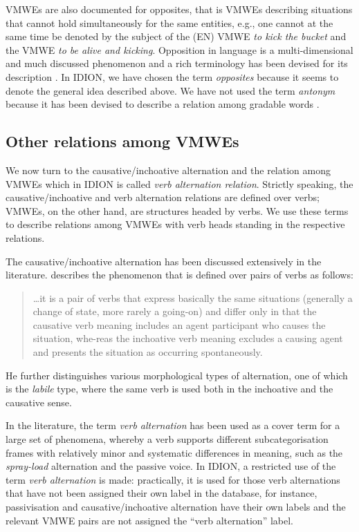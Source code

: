 \documentclass[output=paper,colorlinks,citecolor=brown]{langscibook}
\begin{document}
VMWEs are also documented for opposites, that is VMWEs describing situations that cannot hold simultaneously for the same entities, e.g., one cannot at the same time be denoted by the subject of the (EN) VMWE \textit{to kick the bucket} and the VMWE \textit{to be alive and kicking}. Opposition in language is a multi-dimensional and much discussed phenomenon and a rich terminology has been devised for its description \citep[270--287]{lyons}. In IDION, we have chosen the term \textit{opposites} because it seems to denote the general idea described above. We have not used the term \textit{antonym} because it has been devised to describe a relation among gradable words \citep{lyons}. 

\subsection{Other relations among VMWEs}
\label{sec:causative}

We now turn to the causative/inchoative alternation and the relation among VMWEs which in IDION is called \textit{verb alternation relation}. Strictly speaking, the causative/inchoative and verb alternation relations are defined over verbs;  VMWEs, on the other hand, are structures headed by verbs. We use these terms to describe relations among VMWEs with verb heads standing in the respective relations. 

The causative/inchoative alternation has been discussed extensively in the literature. \citet[90]{haspelmath} describes the phenomenon that is defined over pairs of verbs as follows: \begin{quote}
\ldots it is a pair of verbs that express basically the same situations (generally a change of state, more rarely a going-on) and differ only in that the causative verb meaning includes an agent participant who causes the situation, whe-reas the inchoative verb meaning excludes a causing agent and presents the situation as occurring spontaneously. \end{quote} 

He further distinguishes various morphological types of alternation, one of which is the \textit{labile} type, where the same verb is used both in the inchoative and the causative sense.


In the literature, the term \textit{verb alternation} has been used as a cover term for a large set of phenomena, whereby a verb supports different subcategorisation frames with relatively minor and systematic differences in meaning, such as the \textit{spray-load} alternation and the passive voice. In IDION, a  restricted use of the term \textit{verb alternation} is made: practically, it is used for those verb alternations that have not been assigned their own label in the database, for instance, passivisation and causative/inchoative alternation have their own labels and the relevant VMWE pairs are not assigned the “verb alternation” label.
\end{document}
